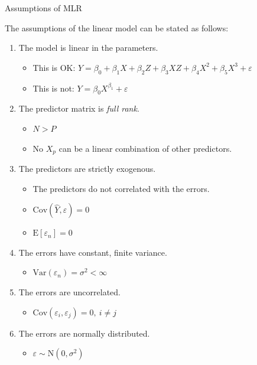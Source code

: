 \documentclass[10pt]{beamer}\usepackage[]{graphicx}\usepackage[]{color}
\begin{document}
\begin{frame}[allowframebreaks]{Assumptions of MLR}

  The assumptions of the linear model can be stated as follows:
  \vb
  \begin{enumerate}
  \item The model is linear in the parameters.
    \vc
    \begin{itemize}
    \item This is OK: $Y = \beta_0 + \beta_1X + \beta_2Z + \beta_3XZ + \beta_4X^2 + \beta_5X^3 + \varepsilon$
      \vc
    \item This is not: $Y = \beta_0 X^{\beta_1} + \varepsilon$
    \end{itemize}
    \vb
  \item The predictor matrix is \emph{full rank}.
    \vc
    \begin{itemize}
    \item $N > P$
      \vc
    \item No $X_p$ can be a linear combination of other predictors.
    \end{itemize}

    \pagebreak

  \item The predictors are strictly exogenous.\label{exo}
    \vc
    \begin{itemize}
    \item The predictors do not correlated with the errors.
      \vc
    \item $\textrm{Cov}(\hat{Y}, \varepsilon) = 0$
      \vc
    \item $\textrm{E}[\varepsilon_n] = 0$
    \end{itemize}
    \vb
  \item The errors have constant, finite variance.\label{constVar}
    \vc
    \begin{itemize}
    \item $\textrm{Var}(\varepsilon_n) = \sigma^2 < \infty$
    \end{itemize}
    \vb
  \item The errors are uncorrelated.\label{indErr}
    \vc
    \begin{itemize}
    \item $\textrm{Cov}(\varepsilon_i, \varepsilon_j) = 0, ~ i \neq j$
    \end{itemize}
    \vb
  \item The errors are normally distributed.\label{normErr}
    \vc
    \begin{itemize}
    \item $\varepsilon \sim \textrm{N}(0, \sigma^2)$
    \end{itemize}
  \end{enumerate}


\end{frame}
\end{document}
